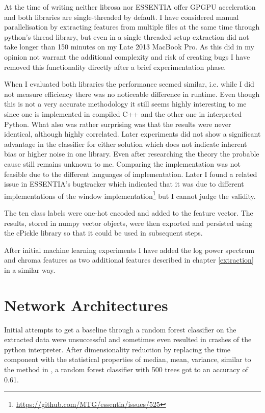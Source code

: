 At the time of writing neither librosa nor ESSENTIA offer GPGPU acceleration and both libraries are single-threaded by default. I have considered manual parallelisation by extracting features from multiple files at the same time through python's thread library, but even in a single threaded setup extraction did not take longer than 150 minutes on my Late 2013 MacBook Pro. As this did in my opinion not warrant the additional complexity and risk of creating bugs I have removed this functionality directly after a brief experimentation phase.

When I evaluated both libraries the performance seemed similar, i.e. while I did not measure efficiency there was no noticeable difference in runtime. Even though this is not a very accurate methodology it still seems highly interesting to me since one is implemented in compiled C++ and the other one in interpreted Python. What also was rather surprising was that the results were never identical, although highly correlated. Later experiments did not show a significant advantage in the classifier for either solution which does not indicate inherent bias or higher noise in one library. Even after researching the theory the  probable cause still remains unknown to me. Comparing the implementation was not feasible due to the different languages of implementation. Later I found a related issue in ESSENTIA's bugtracker which indicated that it was due to different implementations of the window implementation\footnote{\url{https://github.com/MTG/essentia/issues/525}} but I cannot judge the validity.

The ten class labels were one-hot encoded and added to the feature vector. The results, stored in numpy vector objects, were then exported and persisted using the cPickle library so that it could be used in subsequent steps.

After initial machine learning experiments I have added the log power spectrum and chroma features as two additional features described in chapter \ref{extraction} in a similar way.


\section{Network Architectures}

Initial attempts to get a baseline through a random forest classifier on the extracted data were unsuccessful and sometimes even resulted in crashes of the python interpreter. After dimensionality reduction by replacing the time component with the statistical properties of median, mean, variance, similar to the method in \cite{Salamon:UrbanSound:ACMMM:14}, a random forest classifier with 500 trees got to an accuracy of 0.61.


